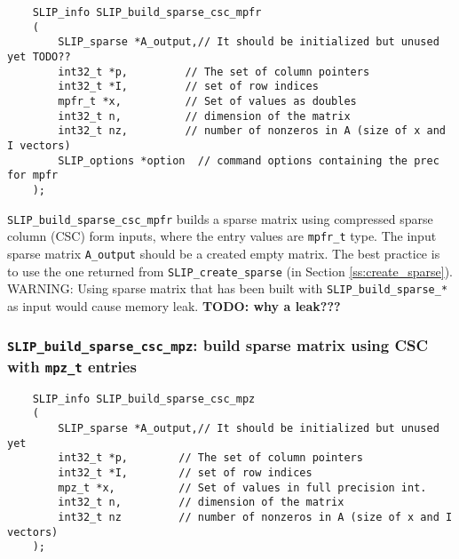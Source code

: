 \documentclass[12pt]{article}
\theoremstyle{definition}
\begin{document}
\begin{mdframed}[userdefinedwidth=6in]
{\footnotesize
\begin{verbatim}
    SLIP_info SLIP_build_sparse_csc_mpfr
    (
        SLIP_sparse *A_output,// It should be initialized but unused yet TODO??
        int32_t *p,         // The set of column pointers
        int32_t *I,         // set of row indices
        mpfr_t *x,          // Set of values as doubles
        int32_t n,          // dimension of the matrix
        int32_t nz,         // number of nonzeros in A (size of x and I vectors)
        SLIP_options *option  // command options containing the prec for mpfr
    );
\end{verbatim}
} \end{mdframed}

\verb|SLIP_build_sparse_csc_mpfr| builds a sparse matrix using compressed
sparse column (CSC) form inputs, where the entry values are \verb|mpfr_t| type.
The input sparse matrix \verb|A_output| should be a created empty matrix. The
best practice is to use the one returned from \verb|SLIP_create_sparse| (in
Section \ref{ss:create_sparse}). WARNING: Using sparse matrix that has been
built with \verb|SLIP_build_sparse_*| as input would cause memory leak.
{\bf TODO: why a leak???} %

\cprotect\subsubsection{\verb|SLIP_build_sparse_csc_mpz|: build sparse matrix using CSC with \verb|mpz_t| entries}
\label{s:user:build_sparse_csc_mpz}

\begin{mdframed}[userdefinedwidth=6in]
{\footnotesize
\begin{verbatim}
    SLIP_info SLIP_build_sparse_csc_mpz
    (
        SLIP_sparse *A_output,// It should be initialized but unused yet
        int32_t *p,        // The set of column pointers
        int32_t *I,        // set of row indices
        mpz_t *x,          // Set of values in full precision int.
        int32_t n,         // dimension of the matrix
        int32_t nz         // number of nonzeros in A (size of x and I vectors)
    );
\end{verbatim}
} \end{mdframed}
\end{document}
